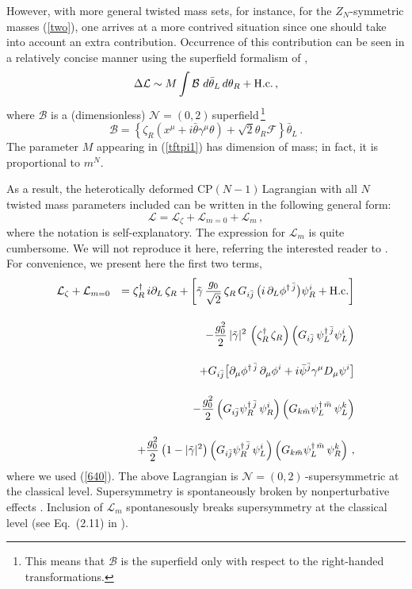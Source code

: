 \documentclass[epsfig,12pt]{article}
\def\beq{\begin{equation}}
\def\eeq{\end{equation}}
\def\beqn{\begin{eqnarray}}
\def\eeqn{\end{eqnarray}}
\newcommand{\nzt}{${\mathcal N}=(0,2)\,$}
\newcommand{\cpn}{CP$(N-1)\,$}
\newcommand{\cell}{{\mathcal L}}
\newcommand{\zn}{$Z_N$}
\def\beqn{\begin{eqnarray}}
\def\eeqn{\end{eqnarray}}
\def\beq{\begin{equation}}
\def\eeq{\end{equation}}
\begin{document}
However, with more general twisted mass sets,
for instance, for the \zn-symmetric masses (\ref{two}), 
one arrives at a more contrived situation since 
one should take into account an extra contribution.
Occurrence of this contribution can be seen \cite{BSY3} in a relatively concise
manner using the superfield formalism of \cite{SY1},
\beq
\Delta\cell \sim M\int  {\mathcal B}\,\,  d\bar\theta_L \, d\theta_R + {\rm H. c.}\,,
\label{tftpi1}
\eeq
where
${\mathcal B}$ is a (dimensionless) \nzt superfield\,\footnote{This means that ${\mathcal B}$
is the superfield only with respect to the right-handed transformations.}
\beq
{\mathcal B} =\left\{\zeta_R\left(x^\mu + i\bar\theta\gamma^\mu\theta\right) +\sqrt{2} \theta_R {\mathcal F}
\right\} \bar\theta_L\,.
\label{tftpi2}
\eeq
 The parameter $M$ appearing in (\ref{tftpi1}) has dimension of mass; in fact, it is proportional to $m^N$.
 
 As a result, the heterotically deformed \cpn Lagrangian with all $N$ twisted mass parameters included
can be written in the following general form:
 \beq
 \cell = \cell_\zeta + \cell_{m=0} +\cell_m\,,
 \label{tftpi3}
 \eeq
 where the notation is self-explanatory. The expression for $\cell_m$ is quite cumbersome.
 We will not reproduce it here, referring the interested reader to \cite{BSY3}.
 For convenience, we present here the first two terms,
\beqn
\cell_\zeta + \cell_{m=0} && 
= 
\zeta_R^\dagger \, i\partial_L \, \zeta_R  + 
\left[\tilde\gamma\, \frac{g_0}{\sqrt 2} \, \zeta_R  \, G_{i\bar j}\,  \big( i\,\partial_{L}\phi^{\dagger\,\bar j} \big)\psi_R^i
+{\rm H.c.}\right]
\nonumber
\\[4mm]
&&
 -\frac{g_0^2}{2}\, |\tilde\gamma |^2 \,\left(\zeta_R^\dagger\, \zeta_R
\right)\left(G_{i\bar j}\,  \psi_L^{\dagger\,\bar j}\psi_L^i\right)
\nonumber
\\[4mm]
&&
+G_{i\bar j} \big[\partial_\mu \phi^{\dagger\,\bar j}\, \partial_\mu\phi^{i}
+i\bar \psi^{\bar j} \gamma^{\mu} D_{\mu}\psi^{i}\big]
\nonumber
\\[4mm]
&&
- \frac{g_0^2}{2}\left( G_{i\bar j}\psi^{\dagger\, \bar j}_R\, \psi^{ i}_R\right)
\left( G_{k\bar m}\psi^{\dagger\, \bar m}_L\, \psi^{ k}_L\right)
\nonumber
\\[4mm]
&&
+\frac{g_0^2}{2}\left(1-|\tilde\gamma|^2\right)
\left( G_{i\bar j}\psi^{\dagger\, \bar j}_R\, \psi^{ i}_L\right)
\left( G_{k\bar m}\psi^{\dagger\, \bar m}_L\, \psi^{ k}_R\right)\,,
\label{cpn-1g}
\eeqn
where we used (\ref{640}). The above Lagrangian is \nzt-supersymmetric at the classical level.
Supersymmetry is spontaneously broken by nonperturbative effects \cite{EdTo,SYhet}. 
Inclusion of $\cell_m$ spontanesously breaks supersymmetry at the classical level (see
Eq.~(2.11) in \cite{BSY3}).
\end{document}
